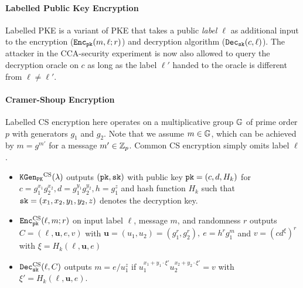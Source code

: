 \paragraph{Labelled Public Key Encryption}
Labelled \ac{PKE} \cite{Shoup01,Canetti2005} is a variant of \ac{PKE} that takes a public \emph{label $\ell$} as additional input to the encryption ($\mathtt{Enc}_\mathtt{pk}(m,\ell; r)$) and decryption algorithm ($\mathtt{Dec}_\mathtt{sk}(c,\ell)$).
The attacker in the \ac{CCA}-security experiment is now also allowed to query the decryption oracle on $c$ as long as the label $\ell'$ handed to the oracle is different from $\ell\not=\ell'$.


\paragraph{Cramer-Shoup Encryption}\label{sec:csencryption}
Labelled \ac{CS} encryption here operates on a multiplicative group $\mathbb{G}$ of prime order $p$ with generators $g_1$ and $g_2$.
Note that we assume $m\in\mathbb{G}$, which can be achieved by $m=g^{m'}$ for a message $m'\in\mathbb{Z}_p$.
Common \ac{CS} encryption simply omits label $\ell$.

\begin{itemize}
  \item $\mathtt{KGen_{PK}}^\mathrm{CS}(\lambda)$ outputs $(\mathtt{pk}, \mathtt{sk})$ with public key $\mathtt{pk}=(c,d,H_k)$ for $c=g_{1}^{x_1}g_{2}^{x_2}, d=g_{1}^{y_1}g_{2}^{y_2}, h=g_{1}^z$ and hash function $H_k$ such that $\mathtt{sk}=(x_1,x_2,y_1,y_2,z)$ denotes the decryption key.
  \item $\mathtt{Enc}^{\mathrm{CS}}_\mathtt{pk}(\ell,m;r)$ on input label $\ell$, message $m$, and randomness $r$ outputs $C=(\ell,\bm{u},e,v)$ with $\bm{u}=(u_1,u_2)=(g_{1}^r,g_{2}^r),~ e=h^rg_1^m$ and $v=(cd^{\xi})^r$ with $\xi=H_k(\ell,\bm{u},e)$
  \item $\mathtt{Dec}_\mathtt{sk}^\mathrm{CS}(\ell,C)$ outputs $m=e/u_1^z$ if $u_1^{x_1+y_1\cdot \xi'}u_2^{x_2+y_2\cdot \xi'}=v$ with $\xi'=H_k(\ell,\bm{u},e)$.
\end{itemize}

